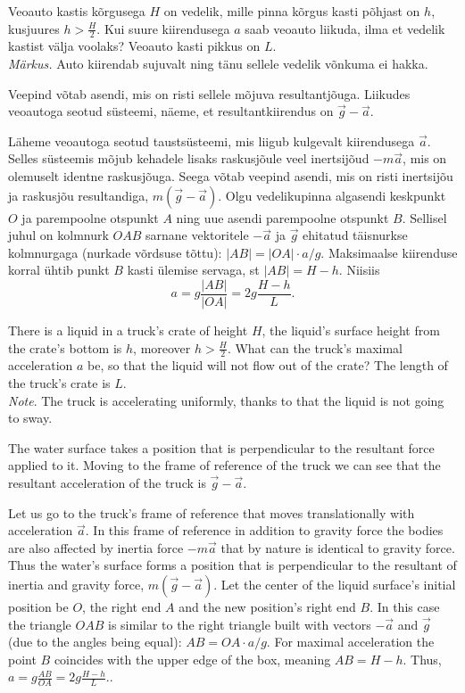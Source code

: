 
Veoauto kastis kõrgusega $H$ on vedelik, mille pinna kõrgus kasti põhjast on 
$h$, kusjuures $h > \frac{H}{2}$. Kui suure kiirendusega $a$ saab veoauto 
liikuda, ilma et vedelik kastist välja voolaks? Veoauto kasti pikkus on $L$.\\
\textit{Märkus.} Auto kiirendab sujuvalt ning tänu sellele vedelik võnkuma ei hakka.

\hint
Veepind võtab asendi, mis on risti sellele mõjuva resultantjõuga. Liikudes veoautoga seotud süsteemi, näeme, et resultantkiirendus on $\vec g - \vec a$.

\solu
Läheme veoautoga seotud taustsüsteemi, mis liigub kulgevalt kiirendusega $\vec a$. Selles süsteemis mõjub
kehadele lisaks raskusjõule veel inertsijõud $-m\vec a$, mis on olemuselt identne raskusjõuga.
Seega võtab veepind asendi, mis on risti inertsijõu ja raskusjõu resultandiga, $m(\vec g-\vec a)$.
Olgu vedelikupinna algasendi keskpunkt $O$ ja parempoolne otspunkt $A$ ning uue asendi parempoolne otspunkt $B$.
Sellisel juhul on kolmnurk $OAB$ sarnane vektoritele $-\vec a$ ja $\vec g$ ehitatud täisnurkse kolmnurgaga (nurkade võrdsuse tõttu):
$|AB|=|OA|\cdot a/g$. Maksimaalse kiirenduse korral ühtib punkt $B$ kasti ülemise servaga, st $|AB|=H-h$. Niisiis
\[
a=g\frac{|AB|}{|OA|}=2g\frac {H-h}{L}.
\]

There is a liquid in a truck’s crate of height $H$, the liquid’s surface height from the crate’s bottom is $h$, moreover $h > \frac{H}{2}$. What can the truck’s maximal acceleration $a$ be, so that the liquid will not flow out of the crate? The length of the truck’s crate is $L$.\\
\emph{Note}. The truck is accelerating uniformly, thanks to that the liquid is not going to sway.

\hinteng
The water surface takes a position that is perpendicular to the resultant force applied to it. Moving to the frame of reference of the truck we can see that the resultant acceleration of the truck is $\vec g - \vec a$.

\solueng
Let us go to the truck’s frame of reference that moves translationally with acceleration $\vec a$. In this frame of reference in addition to gravity force the bodies are also affected by inertia force $-m\vec a$ that by nature is identical to gravity force. Thus the water’s surface forms a position that is perpendicular to the resultant of inertia and gravity force, $m(\vec g-\vec a)$. Let the center of the liquid surface’s initial position be $O$, the right end $A$ and the new position’s right end $B$. In this case the triangle $OAB$ is similar to the right triangle built with vectors $-\vec a$ and $\vec g$ (due to the angles being equal): $AB=OA\cdot a/g$. For maximal acceleration the point $B$ coincides with the upper edge of the box, meaning $AB=H-h$. Thus, $a=g\frac {AB}{OA}=2g\frac {H-h}{L}.$.
\probend